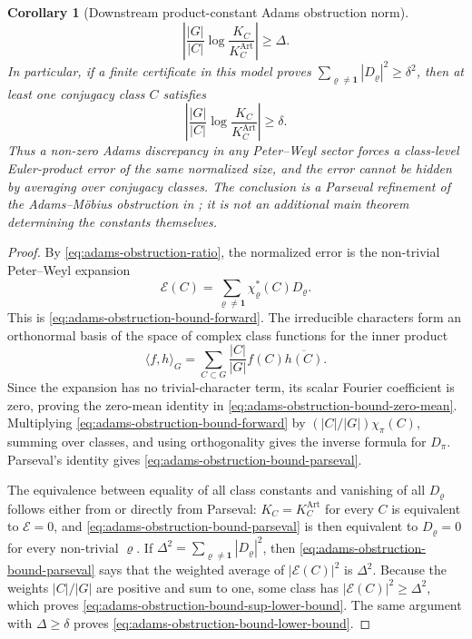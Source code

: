 \documentclass[11pt,a4paper]{amsart}
\theoremstyle{plain}
\newtheorem{corollary}[theorem]{Corollary}
\theoremstyle{definition}
\theoremstyle{remark}
\begin{document}
\begin{corollary}[Downstream product-constant Adams obstruction norm]
  \begin{equation}\label{eq:adams-obstruction-bound-sup-lower-bound}
    \left|
      \frac{|G|}{|C|}
      \log\frac{K_C}{K_C^{\mathrm{Art}}}
    \right|
    \ge \Delta .
  \end{equation}
  In particular, if a finite certificate in this model proves
  \(\sum_{\varrho\neq\mathbf1}|D_\varrho|^2\ge \delta^2\), then at least
  one conjugacy class \(C\) satisfies
  \begin{equation}\label{eq:adams-obstruction-bound-lower-bound}
    \left|
      \frac{|G|}{|C|}
      \log\frac{K_C}{K_C^{\mathrm{Art}}}
    \right|
    \ge \delta.
  \end{equation}
  Thus a non-zero Adams discrepancy in any Peter--Weyl sector forces a
  class-level Euler-product error of the same normalized size, and the
  error cannot be hidden by averaging over conjugacy classes.  The conclusion
  is a Parseval refinement of the Adams--M\"obius obstruction in
  ; it is not an additional main
  theorem determining the constants themselves.
\end{corollary}

\begin{proof}
  By \eqref{eq:adams-obstruction-ratio}, the normalized error is the
  non-trivial Peter--Weyl expansion
  \[
    \mathcal E(C)=
    \sum_{\varrho\neq\mathbf1}\chi_\varrho^\ast(C)D_\varrho.
  \]
  This is \eqref{eq:adams-obstruction-bound-forward}.
  The irreducible characters form an orthonormal basis of the space of
  complex class functions for the inner product
  \[
    \langle f,h\rangle_G
    =
    \sum_{C\subset G}\frac{|C|}{|G|}f(C)\overline{h(C)}.
  \]
  Since the expansion has no trivial-character term, its scalar Fourier
  coefficient is zero, proving the zero-mean identity in
  \eqref{eq:adams-obstruction-bound-zero-mean}.  Multiplying
  \eqref{eq:adams-obstruction-bound-forward} by
  \((|C|/|G|)\chi_\pi(C)\), summing over classes, and using orthogonality
  gives the inverse formula for \(D_\pi\).  Parseval's identity gives
  \eqref{eq:adams-obstruction-bound-parseval}.

  The equivalence between equality of all class constants and vanishing of
  all \(D_\varrho\) follows either from
   or directly from Parseval:
  \(K_C=K_C^{\mathrm{Art}}\) for every \(C\) is equivalent to
  \(\mathcal E=0\), and \eqref{eq:adams-obstruction-bound-parseval} is then
  equivalent to \(D_\varrho=0\) for every non-trivial \(\varrho\).  If
  \(\Delta^2=\sum_{\varrho\neq\mathbf1}|D_\varrho|^2\), then
  \eqref{eq:adams-obstruction-bound-parseval} says that the weighted
  average of \(|\mathcal E(C)|^2\) is \(\Delta^2\). Because the weights
  \(|C|/|G|\) are positive and sum to one, some class has
  \(|\mathcal E(C)|^2\ge\Delta^2\), which proves
  \eqref{eq:adams-obstruction-bound-sup-lower-bound}.  The same argument
  with \(\Delta\ge\delta\) proves
  \eqref{eq:adams-obstruction-bound-lower-bound}.
\end{proof}
\end{document}
